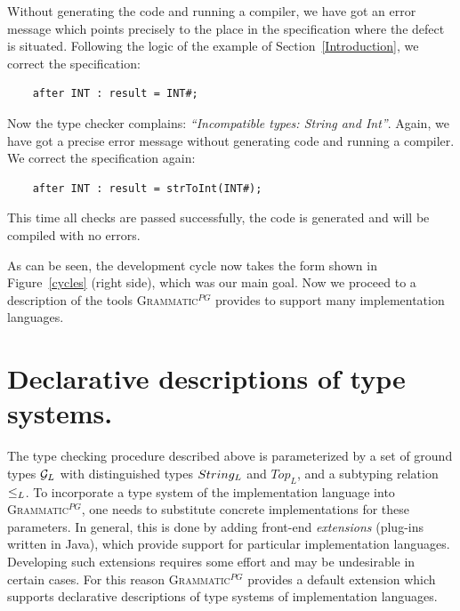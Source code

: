 \documentclass{informat} %
\newcommand{\figref}[1]{Figure~\ref{#1}}
\newcommand{\secref}[1]{Section~\ref{#1}}
\newcommand{\ATF}{\textsc{Grammatic}$^{PG}$}
\begin{document}
Without generating the code and running a compiler, we have got an error message which points precisely to the place in the specification where the defect is situated. Following the logic of the example of \secref{Introduction}, we correct the specification:
\begin{lstlisting}
	after INT : result = INT#;
\end{lstlisting}
Now the type checker complains: \emph{``Incompatible types: String and Int''}. Again, we have got a precise error message without generating code and running a compiler. We correct the specification again:
\begin{lstlisting}
	after INT : result = strToInt(INT#);
\end{lstlisting}
This time all checks are passed successfully, the code is generated and will be compiled with no errors.

As can be seen, the development cycle now takes the form shown in \figref{cycles} (right side), which was our main goal. Now we proceed to a description of the tools \ATF{} provides to support many implementation languages.


\section{Declarative descriptions of type systems.}\label{DefaultExtension}

The type checking procedure described above is parameterized by a set of ground types ${\mathcal{G}_L}$ with distinguished types $String_L$ and $Top_L$, and a subtyping relation~$\le_L$. To incorporate a type system of the implementation language into \ATF{}, one needs to substitute concrete implementations for these parameters. In general, this is done by adding front-end \emph{extensions} (plug-ins written in Java), which provide support for particular implementation languages. Developing such extensions requires some effort and may be undesirable in certain cases. For this reason \ATF{} provides a default extension which supports declarative descriptions of type systems of implementation languages. 
\end{document}
